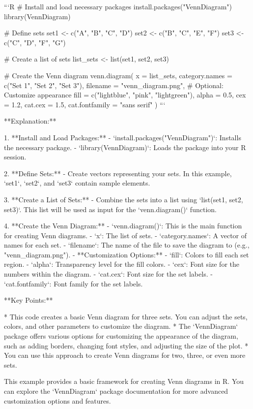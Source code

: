 ```R
# Install and load necessary packages
install.packages("VennDiagram")
library(VennDiagram)

# Define sets 
set1 <- c("A", "B", "C", "D")
set2 <- c("B", "C", "E", "F")
set3 <- c("C", "D", "F", "G")

# Create a list of sets
list_sets <- list(set1, set2, set3)

# Create the Venn diagram
venn.diagram(
  x = list_sets,
  category.names = c("Set 1", "Set 2", "Set 3"),
  filename = "venn_diagram.png", 
  # Optional: Customize appearance
  fill = c("lightblue", "pink", "lightgreen"),
  alpha = 0.5, 
  cex = 1.2,
  cat.cex = 1.5,
  cat.fontfamily = "sans serif"
) 
```

**Explanation:**

1. **Install and Load Packages:**
   - `install.packages("VennDiagram")`: Installs the necessary package.
   - `library(VennDiagram)`: Loads the package into your R session.

2. **Define Sets:**
   - Create vectors representing your sets. In this example, `set1`, `set2`, and `set3` contain sample elements.

3. **Create a List of Sets:**
   - Combine the sets into a list using `list(set1, set2, set3)`. This list will be used as input for the `venn.diagram()` function.

4. **Create the Venn Diagram:**
   - `venn.diagram()`: This is the main function for creating Venn diagrams.
      - `x`: The list of sets.
      - `category.names`: A vector of names for each set.
      - `filename`: The name of the file to save the diagram to (e.g., "venn_diagram.png").
      - **Customization Options:**
         - `fill`: Colors to fill each set region.
         - `alpha`: Transparency level for the fill colors.
         - `cex`: Font size for the numbers within the diagram.
         - `cat.cex`: Font size for the set labels.
         - `cat.fontfamily`: Font family for the set labels.

**Key Points:**

* This code creates a basic Venn diagram for three sets. You can adjust the sets, colors, and other parameters to customize the diagram.
* The `VennDiagram` package offers various options for customizing the appearance of the diagram, such as adding borders, changing font styles, and adjusting the size of the plot.
* You can use this approach to create Venn diagrams for two, three, or even more sets.

This example provides a basic framework for creating Venn diagrams in R. You can explore the `VennDiagram` package documentation for more advanced customization options and features.
